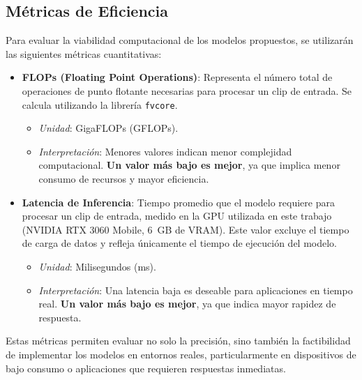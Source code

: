 \subsection{Métricas de Eficiencia}

Para evaluar la viabilidad computacional de los modelos propuestos, se utilizarán las siguientes métricas cuantitativas:

\begin{itemize}
    \item \textbf{FLOPs (Floating Point Operations)}: Representa el número total de operaciones de punto flotante necesarias para procesar un clip de entrada. Se calcula utilizando la librería \texttt{fvcore}.
    \begin{itemize}
        \item \textit{Unidad}: GigaFLOPs (GFLOPs).
        \item \textit{Interpretación}: Menores valores indican menor complejidad computacional. \textbf{Un valor más bajo es mejor}, ya que implica menor consumo de recursos y mayor eficiencia.
    \end{itemize}

    \item \textbf{Latencia de Inferencia}: Tiempo promedio que el modelo requiere para procesar un clip de entrada, medido en la GPU utilizada en este trabajo (NVIDIA RTX 3060 Mobile, 6~GB de VRAM). Este valor excluye el tiempo de carga de datos y refleja únicamente el tiempo de ejecución del modelo.
    \begin{itemize}
        \item \textit{Unidad}: Milisegundos (ms).
        \item \textit{Interpretación}: Una latencia baja es deseable para aplicaciones en tiempo real. \textbf{Un valor más bajo es mejor}, ya que indica mayor rapidez de respuesta.
    \end{itemize}
\end{itemize}

Estas métricas permiten evaluar no solo la precisión, sino también la factibilidad de implementar los modelos en entornos reales, particularmente en dispositivos de bajo consumo o aplicaciones que requieren respuestas inmediatas.


